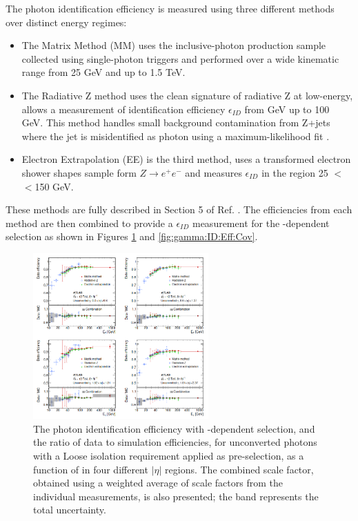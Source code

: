 The photon identification efficiency is measured using three different methods over distinct energy regimes:
\begin{itemize}
\item The Matrix Method (MM) uses the inclusive-photon production sample collected using single-photon triggers and performed over a wide kinematic range from 25 GeV and up to 1.5 TeV. 
\item The Radiative Z method uses the clean signature of radiative Z at low-energy, allows a measurement of identification efficiency $\epsilon_{ID}$ from  GeV up to 100 GeV. This method handles small background contamination from Z+jets where the jet is misidentified as photon using a maximum-likelihood fit \cite{Photon_Eff_Run1}. 
\item Electron Extrapolation (EE) is the third method, uses a transformed electron shower shapes sample form $Z\rightarrow e^+e^-$ and measures $\epsilon_{ID}$ in the region 25 $<$\eT$<$150 GeV.
\end{itemize}
These methods are fully described in Section 5 of Ref. \cite{Photon_Eff_2015}. The efficiencies from each method are then combined to provide a $\epsilon_{ID}$ measurement for the \eT-dependent selection as shown in Figures \ref{fig:gamma:ID:Eff:UnCov} and \ref{fig:gamma:ID:Eff:Cov}. 
\begin{figure}[ht]
    \centering
    \includegraphics[width=0.6\textwidth]{Ch3/Img/Unconverted_Eff_2017.png}
    \caption{The photon identification efficiency with \eT-dependent selection, and the ratio of data to simulation efficiencies, for unconverted photons with a Loose isolation requirement applied as pre-selection, as a function of \eT in four different $|\eta|$ regions. The combined scale factor, obtained using a weighted average of scale factors from the individual measurements, is also presented; the band represents the total uncertainty.}
    \label{fig:gamma:ID:Eff:UnCov}
\end{figure}
